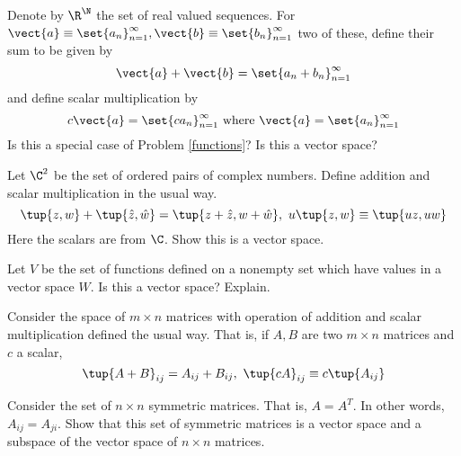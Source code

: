 \begin{enumialphparenastyle}
\begin{ex} Denote by $\R^{\N}$ the set of real valued sequences.
For $\vect{a}\equiv \set{a_{n}} _{n=1}^{\infty },\vect{b}\equiv
\set{b_{n}} _{n=1}^{\infty }$ two of these, define their sum to be
given by 
\begin{equation*}
\vect{a}+\vect{b} =  \set{a_{n}+b_{n}} _{n=1}^{\infty }
\end{equation*}
and define scalar multiplication by 
\begin{equation*}
c\vect{a}=\set{ca_{n}} _{n=1}^{\infty }\text{ where }\vect{a}
=\set{a_{n}} _{n=1}^{\infty }
\end{equation*}
Is this a special case of Problem \ref{functions}? Is this a vector space?
\end{ex}

\begin{ex} Let $\C^{2}$ be the set of ordered pairs of complex numbers.
Define addition and scalar multiplication in the usual way.
\begin{equation*}
\tup{z,w} +\tup{\hat{z},\hat{w}} = \tup{z+\hat{z},w+
\hat{w}} ,\ u\tup{z,w} \equiv \tup{uz,uw}
\end{equation*}
Here the scalars are from $\C$. Show this is a vector space.
\end{ex}

\begin{ex} Let $V$ be the set of functions defined on a nonempty set which have
values in a vector space $W$. Is this a vector space? Explain.
\end{ex}

\begin{ex} Consider the space of $m\times n$ matrices with operation of addition
and scalar multiplication defined the usual way. That is, if $A,B$ are two $
m\times n$ matrices and $c$ a scalar, 
\begin{equation*}
\tup{A+B} _{ij}=A_{ij}+B_{ij},\ \tup{cA} _{ij}\equiv c\tup{
A_{ij}}
\end{equation*}
\end{ex}

\begin{ex} Consider the set of $n\times n$ symmetric matrices. That is, $A=A^{T}$.
In other words, $A_{ij}=A_{ji}$. Show that this set of symmetric matrices is
a vector space and a subspace of the vector space of $n\times n$ matrices.
\end{ex}


\end{enumialphparenastyle}
